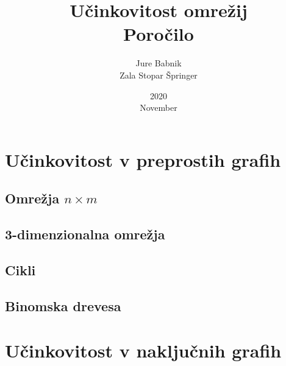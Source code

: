 \documentclass[a4paper, 16pt]{article}
\title{%
    Učinkovitost omrežij \\ 
    \large Poročilo}
\date{2020\\ November}
\author{Jure Babnik \\  Zala Stopar Špringer}
\begin{document}
\maketitle
{}


\newpage

\tableofcontents

\newpage
{}

\section{Učinkovitost v preprostih grafih}

    \subsection{Omrežja $n \times m$}

    \subsection{3-dimenzionalna omrežja}

    \subsection{Cikli}

    \subsection{Binomska drevesa}

\section{Učinkovitost v naključnih grafih}
\end{document}
